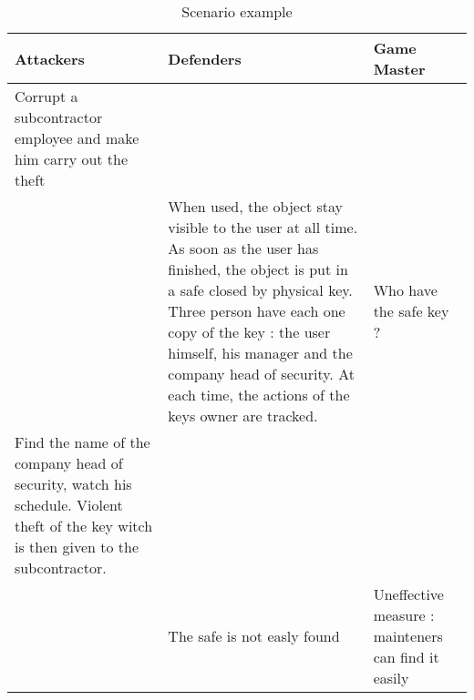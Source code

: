 \documentclass[11pt]{article} %
\begin{document}
\begin{longtable}{|p{4cm}|p{4cm}|p{4cm}|}
\caption[Scenario example]{Scenario example}\\

\hline
Attackers & Defenders & Game Master \\
\hline
\endhead

\hline \endfoot
          
Corrupt a subcontractor employee and make him carry out the theft && \\
& When used, the object stay visible to the user at all time. As soon as the user
 has finished, the object is put in a safe closed by physical key. Three person have 
each one copy of the key : the user himself, his manager and the company head 
of security. At each time, the actions of the keys owner are tracked. &
Who have the safe key ? \\
Find the name of the company head of security, watch his schedule. 
Violent theft of the key witch is then given to the subcontractor. && \\
& The safe is not easly found & 
Uneffective measure : mainteners can find it easily \\

\end{longtable}
\end{document}
